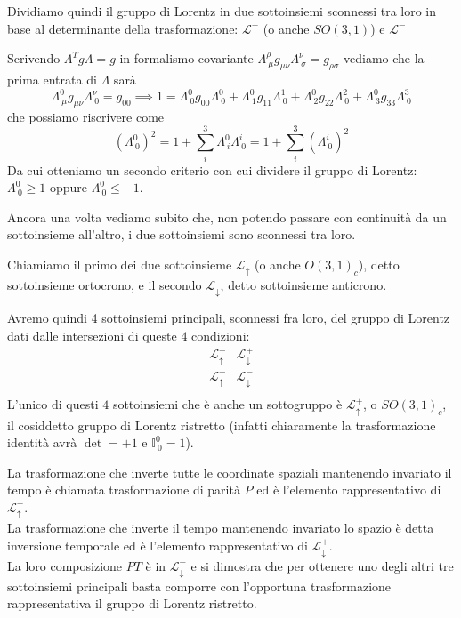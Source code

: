 \documentclass[12pt,a4paper,titlepage, twoside, openright]{book}
\numberwithin{equation}{chapter}
\begin{document}
Dividiamo quindi il gruppo di Lorentz in due sottoinsiemi sconnessi tra loro in base al determinante della trasformazione: $\mathcal{L}^+$ (o anche $SO(3,1)$) e $\mathcal{L}^{-}$

Scrivendo $\Lambda^T g \Lambda=g$ in formalismo covariante $\Lambda^{\rho}_{\> \mu}g_{\mu\nu}\Lambda^{\nu}_{\> \sigma}=g_{\rho\sigma}$ vediamo che la prima entrata di $\Lambda$ sarà
\[
\Lambda^{0}_{\> \mu}g_{\mu\nu}\Lambda^{\nu}_{\> 0}=g_{00} \implies 1=\Lambda^{0}_{\> 0}g_{00}\Lambda^{0}_{\> 0}+\Lambda^{0}_{\> 1}g_{11}\Lambda^{1}_{\> 0}+\Lambda^{0}_{\> 2}g_{22}\Lambda^{2}_{\> 0}+\Lambda^{0}_{\> 3}g_{33}\Lambda^{3}_{\> 0}
\]
che possiamo riscrivere come
\[
\left( \Lambda^0_{\>0} \right)^2 = 1+ \sum_{i}^3 \Lambda^0_{\> i}\Lambda^i_{\> 0} =1+ \sum_{i}^3 \left( \Lambda^i_{\> 0} \right)^2
\]
Da cui otteniamo un secondo criterio con cui dividere il gruppo di Lorentz: $\Lambda^0_{\>0} \geq 1$  oppure $\Lambda^0_{\>0} \leq - 1$.

Ancora una volta vediamo subito che, non potendo passare con continuità da un sottoinsieme all'altro, i due sottoinsiemi sono sconnessi tra loro. 

Chiamiamo il primo dei due sottoinsieme $\mathcal{L}_{\uparrow}$ (o anche $O(3,1)_c$), detto sottoinsieme ortocrono, e il secondo $\mathcal{L}_{\downarrow}$, detto sottoinsieme anticrono.

Avremo quindi 4 sottoinsiemi principali, sconnessi fra loro, del gruppo di Lorentz dati dalle intersezioni di queste $4$ condizioni:
\[
\begin{array}{cc}
\mathcal{L}_{\uparrow}^{+} & \mathcal{L}_{\downarrow}^{+}\\
\mathcal{L}_{\uparrow}^{-} & \mathcal{L}_{\downarrow}^{-}\\
\end{array}
\]
L'unico di questi $4$ sottoinsiemi che è anche un sottogruppo è $\mathcal{L}_{\uparrow}^{+}$, o $SO(3,1)_c$, il cosiddetto gruppo di Lorentz ristretto (infatti chiaramente la trasformazione identità avrà $\det=+1$ e $\mathbb{I}^0_{\> 0}=1$).

La trasformazione che inverte tutte le coordinate spaziali mantenendo invariato il tempo è chiamata trasformazione di parità $P$ ed è l'elemento rappresentativo di $\mathcal{L}_{\uparrow}^{-}$.\\
La trasformazione che inverte il tempo mantenendo invariato lo spazio è detta inversione temporale ed è l'elemento rappresentativo di $\mathcal{L}_{\downarrow}^{+}$.\\
La loro composizione $PT$ è in $\mathcal{L}_{\downarrow}^{-}$ e si dimostra che per ottenere uno degli altri tre sottoinsiemi principali basta comporre con l'opportuna trasformazione rappresentativa il gruppo di Lorentz ristretto.
\end{document}

